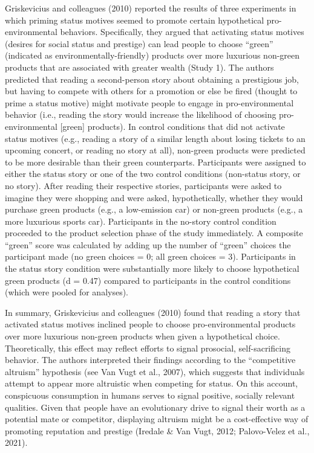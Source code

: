 \documentclass[
]{article}
\begin{document}
Griskevicius and colleagues (2010) reported the results of three
experiments in which priming status motives seemed to promote certain
hypothetical pro-environmental behaviors. Specifically, they argued that
activating status motives (desires for social status and prestige) can
lead people to choose ``green'' (indicated as environmentally-friendly)
products over more luxurious non-green products that are associated with
greater wealth (Study 1). The authors predicted that reading a
second-person story about obtaining a prestigious job, but having to
compete with others for a promotion or else be fired (thought to prime a
status motive) might motivate people to engage in pro-environmental
behavior (i.e., reading the story would increase the likelihood of
choosing pro-environmental {[}green{]} products). In control conditions
that did not activate status motives (e.g., reading a story of a similar
length about losing tickets to an upcoming concert, or reading no story
at all), non-green products were predicted to be more desirable than
their green counterparts. Participants were assigned to either the
status story or one of the two control conditions (non-status story, or
no story). After reading their respective stories, participants were
asked to imagine they were shopping and were asked, hypothetically,
whether they would purchase green products (e.g., a low-emission car) or
non-green products (e.g., a more luxurious sports car). Participants in
the no-story control condition proceeded to the product selection phase
of the study immediately. A composite ``green'' score was calculated by
adding up the number of ``green'' choices the participant made (no green
choices = 0; all green choices = 3). Participants in the status story
condition were substantially more likely to choose hypothetical green
products (d = 0.47) compared to participants in the control conditions
(which were pooled for analyses).

In summary, Griskevicius and colleagues (2010) found that reading a
story that activated status motives inclined people to choose
pro-environmental products over more luxurious non-green products when
given a hypothetical choice. Theoretically, this effect may reflect
efforts to signal prosocial, self-sacrificing behavior. The authors
interpreted their findings according to the ``competitive altruism''
hypothesis (see Van Vugt et al., 2007), which suggests that individuals
attempt to appear more altruistic when competing for status. On this
account, conspicuous consumption in humans serves to signal positive,
socially relevant qualities. Given that people have an evolutionary
drive to signal their worth as a potential mate or competitor,
displaying altruism might be a cost-effective way of promoting
reputation and prestige (Iredale \& Van Vugt, 2012; Palovo-Velez et al.,
2021).
\end{document}
